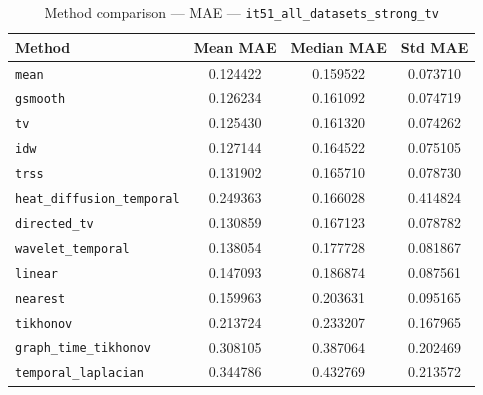 \begin{table}[ht]
\centering
\caption{Method comparison — MAE — \texttt{it51_all_datasets_strong_tv}}
\label{tab:mae_it51_all_datasets_strong_tv}
\begin{tabular}{lccc}
\hline
Method & Mean MAE & Median MAE & Std MAE \\
\hline
\texttt{mean} & 0.124422 & 0.159522 & 0.073710 \\
\texttt{gsmooth} & 0.126234 & 0.161092 & 0.074719 \\
\texttt{tv} & 0.125430 & 0.161320 & 0.074262 \\
\texttt{idw} & 0.127144 & 0.164522 & 0.075105 \\
\texttt{trss} & 0.131902 & 0.165710 & 0.078730 \\
\texttt{heat_diffusion_temporal} & 0.249363 & 0.166028 & 0.414824 \\
\texttt{directed_tv} & 0.130859 & 0.167123 & 0.078782 \\
\texttt{wavelet_temporal} & 0.138054 & 0.177728 & 0.081867 \\
\texttt{linear} & 0.147093 & 0.186874 & 0.087561 \\
\texttt{nearest} & 0.159963 & 0.203631 & 0.095165 \\
\texttt{tikhonov} & 0.213724 & 0.233207 & 0.167965 \\
\texttt{graph_time_tikhonov} & 0.308105 & 0.387064 & 0.202469 \\
\texttt{temporal_laplacian} & 0.344786 & 0.432769 & 0.213572 \\
\hline
\end{tabular}
\end{table}
